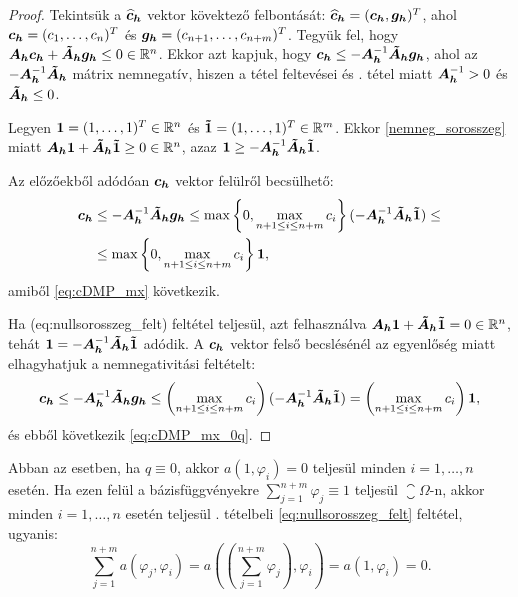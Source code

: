 \begin{proof} \cite{kar-kor}
	Tekintsük a $\bm{\widehat{c}_h}$ vektor kövektező felbontását: $\bm{\widehat{c}_h} = (\bm{c_h} ,\bm{g_h})^T $, ahol $\bm{c_h} = (c_1, \ldots, c_{n})^T$ és $\bm{g_h} = (c_{n+1}, \ldots, c_{n+m})^T$. Tegyük fel, hogy $\bm{A_h}\bm{c_h} + \bm{\tilde{A}_h} \bm{g_h} \leq 0 \in \mathbb{R}^n$. Ekkor azt kapjuk, hogy $\bm{c_h} \leq -\bm{A_h}^{-1} \bm{\tilde{A}_h} \bm{g_h}$, ahol az $ - \bm{A_h}^{-1} \bm{\tilde{A}_h}$ mátrix nemnegatív, hiszen a tétel feltevései és . tétel miatt $\bm{A_h}^{-1} > 0$ és $\bm{\tilde{A}_h} \leq 0$. 
	
	Legyen  $\bm{1} = (1, \ldots, 1)^T \in \mathbb{R}^n$ és  $ \bm{\tilde{1}} = (1, \ldots, 1)^T \in \mathbb{R}^m$. Ekkor \ref{nemneg_sorosszeg} miatt $\bm{A_h}\bm{1} + \bm{\tilde{A}_h}\bm{\tilde{1}} \geq 0 \in \mathbb{R}^n$, azaz $\bm{1} \geq - \bm{A_h}^{-1} \bm{\tilde{A}_h} \bm{\tilde{1}}$.
	
	Az előzőekből adódóan   $\bm{c_h}$ vektor felülről becsülhető:
	\begin{align*}	
		\bm{c_h} &\leq -\bm{A_h}^{-1} \bm{\tilde{A}_h} \bm{g_h} \leq \max \left\{0, \max_{n+1 \leq i \leq n+m} c_i \right\}  (- \bm{A_h}^{-1} \bm{\tilde{A}_h} \bm{\tilde{1}}) \leq \\
		&\leq \max \left\{0, \max_{n+1 \leq i \leq n+m} c_i \right\} \bm{1},
	\end{align*}
	amiből \eqref{eq:cDMP_mx} következik.
	
	Ha \aref({eq:nullsorosszeg_felt}) feltétel teljesül, azt felhasználva $\bm{A_h}\bm{1} + \bm{\tilde{A}_h}\bm{\tilde{1}} = 0 \in \mathbb{R}^n$, tehát $\bm{1} = - \bm{A_h}^{-1} \bm{\tilde{A}_h} \bm{\tilde{1}}$ adódik. A $\bm{c_h}$ vektor felső becslésénél az egyenlőség miatt elhagyhatjuk a nemnegativitási feltételt:
	\begin{equation*}
		\bm{c_h} \leq -\bm{A_h}^{-1} \bm{\tilde{A}_h} \bm{g_h} \leq \left( \max_{n+1 \leq i \leq n+m} c_i \right) (- \bm{A_h}^{-1} \bm{\tilde{A}_h} \bm{\tilde{1}}) = \left( \max_{n+1 \leq i \leq n+m} c_i \right)\bm{1},
	\end{equation*}
	és ebből következik  \eqref{eq:cDMP_mx_0q}.	
\end{proof}

\begin{remark}\label{rem:qqphi_felt}
	Abban az esetben, ha $q \equiv 0$, akkor  $a(1,\varphi_i) = 0$ teljesül minden $i = 1, \ldots, n$ esetén. Ha ezen felül a bázisfüggvényekre $\sum_{j = 1}^{n+m}\varphi_{j} \equiv 1 $ teljesül $\closure{\Omega}$-n, akkor minden $i = 1, \ldots, n$ esetén teljesül . tételbeli \eqref{eq:nullsorosszeg_felt} feltétel, ugyanis:
	\begin{equation*}
		\sum_{j = 1}^{n+m} a(\varphi_j,\varphi_i) = a\left( \left( \sum_{j = 1}^{n+m}\varphi_{j}\right), \varphi_i \right) = a(1,\varphi_i) = 0.
	\end{equation*}
\end{remark}	


